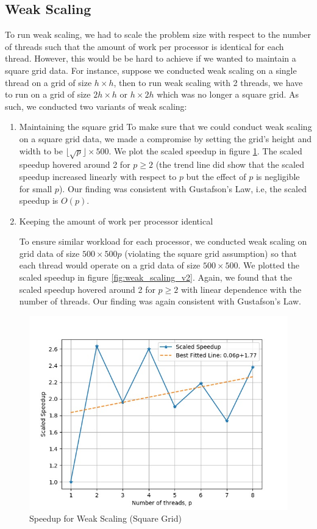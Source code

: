 \documentclass{article}
\begin{document}
\subsection{Weak Scaling}
To run weak scaling, we had to scale the problem size with respect to the number of threads such that the amount of work per processor is identical for each thread. 
However, this would be be hard to achieve if we wanted to maintain a square grid data. 
For instance, suppose we conducted weak scaling on a single thread on a grid of size $h \times h$, then to run weak scaling with 2 threads, 
we have to run on a grid of size $2h \times h$ or $h \times 2h$ which was no longer a square grid. As such, we conducted two variants of weak scaling:

\begin{enumerate}
    \item Maintaining the square grid
    \newline
    To make sure that we could conduct weak scaling on a square grid data, we made a compromise by setting the grid’s height and width to be $\lfloor \sqrt{p} \rfloor \times 500$. 
    We plot the scaled speedup in figure \ref{fig:weak_scaling}. The scaled speedup hovered around 2 for $p \ge 2$ (the trend line did show that the scaled speedup increased linearly with respect to $p$ but the effect of $p$ is negligible for small $p$). 
    Our finding was consistent with Gustafson’s Law, i.e, the scaled speedup is $O(p)$.

    \item Keeping the amount of work per processor identical

    To ensure similar workload for each processor, we conducted weak scaling on grid data of size $500 \times 500p$ (violating the square grid assumption) so that each thread would operate on a grid data of size $500 \times 500$. 
    We plotted the scaled speedup in figure \ref{fig:weak_scaling_v2}. Again, we found that the scaled speedup hovered around 2 for $p \ge 2$ with linear dependence with the number of threads. 
    Our finding was again consistent with Gustafson’s Law.
\end{enumerate}
\begin{figure}[h!]
	\centering
	\includegraphics[width=0.8\columnwidth]{../weak_scaling.jpg}
	\caption{Speedup for Weak Scaling (Square Grid)}
	\label{fig:weak_scaling}
\end{figure}
\end{document}
